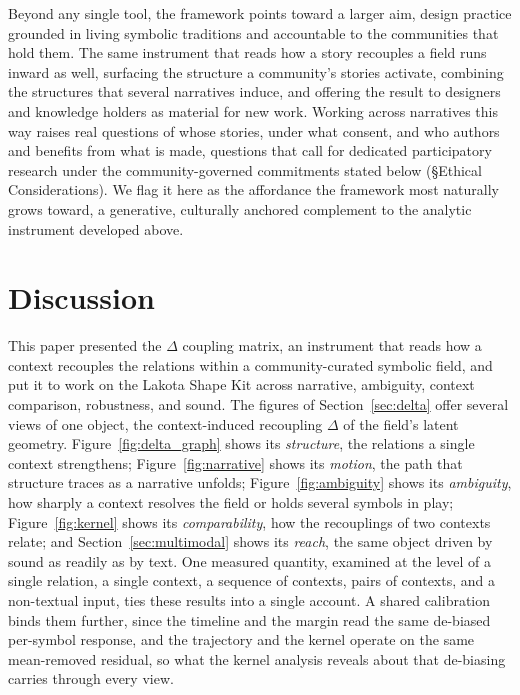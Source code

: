 \documentclass[final,creativeai]{article}
\begin{document}
Beyond any single tool, the framework points toward a larger aim, design practice grounded in living symbolic traditions and accountable to the communities that hold them. The same instrument that reads how a story recouples a field runs inward as well, surfacing the structure a community's stories activate, combining the structures that several narratives induce, and offering the result to designers and knowledge holders as material for new work. Working across narratives this way raises real questions of whose stories, under what consent, and who authors and benefits from what is made, questions that call for dedicated participatory research under the community-governed commitments stated below (\S Ethical Considerations). We flag it here as the affordance the framework most naturally grows toward, a generative, culturally anchored complement to the analytic instrument developed above.

\FloatBarrier
\section{Discussion}
\label{sec:discussion}
This paper presented the $\Delta$ coupling matrix, an instrument that reads how a context recouples the relations within a community-curated symbolic field, and put it to work on the Lakota Shape Kit across narrative, ambiguity, context comparison, robustness, and sound. The figures of Section~\ref{sec:delta} offer several views of one object, the context-induced recoupling $\Delta$ of the field's latent geometry. Figure~\ref{fig:delta_graph} shows its \emph{structure}, the relations a single context strengthens; Figure~\ref{fig:narrative} shows its \emph{motion}, the path that structure traces as a narrative unfolds; Figure~\ref{fig:ambiguity} shows its \emph{ambiguity}, how sharply a context resolves the field or holds several symbols in play; Figure~\ref{fig:kernel} shows its \emph{comparability}, how the recouplings of two contexts relate; and Section~\ref{sec:multimodal} shows its \emph{reach}, the same object driven by sound as readily as by text. One measured quantity, examined at the level of a single relation, a single context, a sequence of contexts, pairs of contexts, and a non-textual input, ties these results into a single account. A shared calibration binds them further, since the timeline and the margin read the same de-biased per-symbol response, and the trajectory and the kernel operate on the same mean-removed residual, so what the kernel analysis reveals about that de-biasing carries through every view.
\end{document}
